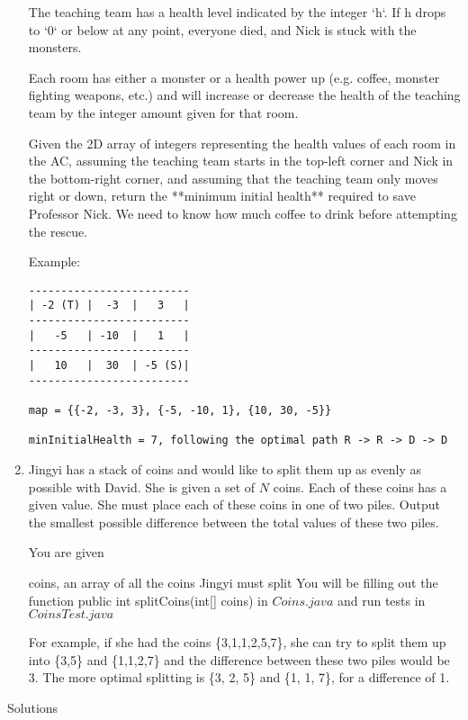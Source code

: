 \documentclass{article}
\begin{document}
\begin{enumerate}
The teaching team has a health level indicated by the integer `h`.  If h drops to `0` or below at any point, everyone died, and Nick is stuck with the monsters.

Each room has either a monster or a health power up (e.g. coffee, monster fighting weapons, etc.) and will increase or decrease the health of the teaching team by the integer amount given for that room.

Given the 2D array of integers representing the health values of each room in the AC, assuming the teaching team starts in the top-left corner and Nick in the bottom-right corner, and assuming that the teaching team only moves right or down, return the **minimum initial health** required to save Professor Nick.  We need to know how much coffee to drink before attempting the rescue.


Example:

\begin{lstlisting}
-------------------------
| -2 (T) |  -3	|   3   |
-------------------------
|   -5   | -10  |   1   |
-------------------------
|   10   |  30  | -5 (S)|
-------------------------

map = {{-2, -3, 3}, {-5, -10, 1}, {10, 30, -5}}

minInitialHealth = 7, following the optimal path R -> R -> D -> D
\end{lstlisting}


\item Jingyi has a stack of coins and would like to split them up as evenly as possible with David. She is given a set of $N$ coins. Each of these coins has a given value. She must place each of these coins in one of two piles. Output the smallest possible difference between the total values of these two piles.

You are given

coins, an array of all the coins Jingyi must split
You will be filling out the function public int splitCoins(int[] coins) in $Coins.java$ and run tests in $CoinsTest.java$

For example, if she had the coins \{3,1,1,2,5,7\}, she can try to split them up into \{3,5\} and \{1,1,2,7\} and the difference between these two piles would be 3. The more optimal splitting is \{3, 2, 5\} and \{1, 1, 7\}, for a difference of 1.

\end{enumerate}

\newpage

\begin{center}
Solutions
\end{center}
\end{document}
